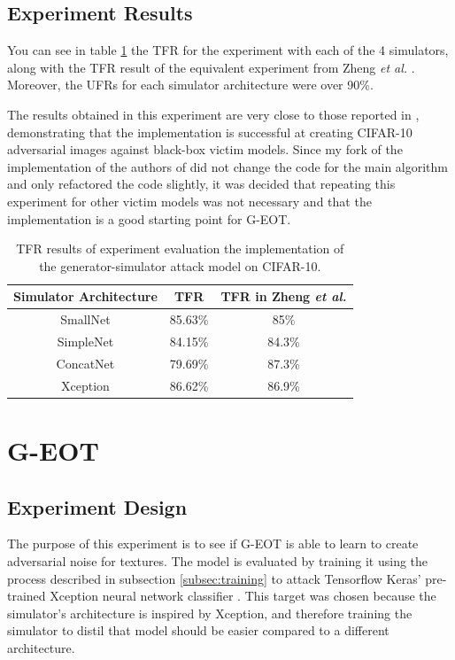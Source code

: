 \subsection{Experiment Results}

You can see in table \ref{table:generator_simulator_results} the TFR for the experiment with each of the 4 simulators, along with the TFR result of the equivalent experiment from Zheng \textit{et al.} \cite{zheng_black_box_GAN}. Moreover, the UFRs for each simulator architecture were over 90\%.

The results obtained in this experiment are very close to those reported in \cite{zheng_black_box_GAN}, demonstrating that the implementation is successful at creating CIFAR-10 adversarial images against black-box victim models. Since my fork of the implementation of the authors of \cite{zheng_black_box_GAN} did not change the code for the main algorithm and only refactored the code slightly, it was decided that repeating this experiment for other victim models was not necessary and that the implementation is a good starting point for G-EOT.

\begin{table}
\centering
\caption{TFR results of experiment evaluation the implementation of the generator-simulator attack model on CIFAR-10.}
\label{table:generator_simulator_results}
\begin{tabular}{| c | c | c |} 
 \hline
 Simulator Architecture & TFR & TFR in Zheng \textit{et al.} \cite{zheng_black_box_GAN} \\ [0.5ex] 
 \hline
 \hline
 SmallNet & 85.63\% & 85\% \\ 
 \hline
 SimpleNet & 84.15\% & 84.3\% \\ [1ex] 
 \hline
 ConcatNet & 79.69\% & 87.3\% \\
 \hline
 Xception & 86.62\% & 86.9\%  \\
 \hline
\end{tabular}
\end{table}

\section{G-EOT}

\subsection{Experiment Design}
    \label{subsec:g_eot_experiment_design}

The purpose of this experiment is to see if G-EOT is able to learn to create adversarial noise for textures. The model is evaluated by training it using the process described in subsection \ref{subsec:training} to attack Tensorflow Keras' pre-trained Xception neural network classifier \cite{xception}. This target was chosen because the simulator's architecture is inspired by Xception, and therefore training the simulator to distil that model should be easier compared to a different architecture.

